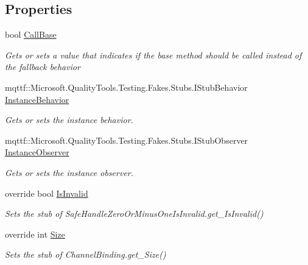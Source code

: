 \subsection*{Properties}
\begin{DoxyCompactItemize}
\item 
bool \hyperlink{class_system_1_1_security_1_1_authentication_1_1_extended_protection_1_1_fakes_1_1_stub_channel_binding_a3ca91298f36bd76e81784dd556674629}{Call\-Base}
\begin{DoxyCompactList}\small\item\em Gets or sets a value that indicates if the base method should be called instead of the fallback behavior\end{DoxyCompactList}\item 
mqttf\-::\-Microsoft.\-Quality\-Tools.\-Testing.\-Fakes.\-Stubs.\-I\-Stub\-Behavior \hyperlink{class_system_1_1_security_1_1_authentication_1_1_extended_protection_1_1_fakes_1_1_stub_channel_binding_a09f667783ab2b538abf511b15b937a22}{Instance\-Behavior}
\begin{DoxyCompactList}\small\item\em Gets or sets the instance behavior.\end{DoxyCompactList}\item 
mqttf\-::\-Microsoft.\-Quality\-Tools.\-Testing.\-Fakes.\-Stubs.\-I\-Stub\-Observer \hyperlink{class_system_1_1_security_1_1_authentication_1_1_extended_protection_1_1_fakes_1_1_stub_channel_binding_a21ba0eb2112030675954071e432bc117}{Instance\-Observer}
\begin{DoxyCompactList}\small\item\em Gets or sets the instance observer.\end{DoxyCompactList}\item 
override bool \hyperlink{class_system_1_1_security_1_1_authentication_1_1_extended_protection_1_1_fakes_1_1_stub_channel_binding_ae24785e1d7d02ddb373899ab3687ed50}{Is\-Invalid}
\begin{DoxyCompactList}\small\item\em Sets the stub of Safe\-Handle\-Zero\-Or\-Minus\-One\-Is\-Invalid.\-get\-\_\-\-Is\-Invalid()\end{DoxyCompactList}\item 
override int \hyperlink{class_system_1_1_security_1_1_authentication_1_1_extended_protection_1_1_fakes_1_1_stub_channel_binding_a36b6ebc6b8054bff1af2903c6159f1ab}{Size}
\begin{DoxyCompactList}\small\item\em Sets the stub of Channel\-Binding.\-get\-\_\-\-Size()\end{DoxyCompactList}\end{DoxyCompactItemize}


